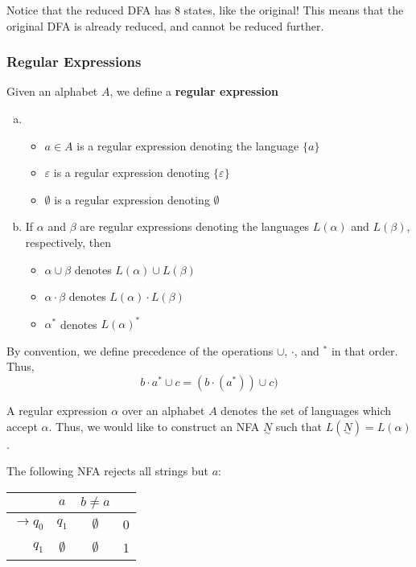 Notice that the reduced DFA has 8 states, like the original! This means that the original DFA is already reduced, and cannot be reduced further.

\subsubsection{Regular Expressions}
\begin{definition}
Given an alphabet $A$, we define a \textbf{regular expression}
\begin{enumerate}[(a)]
    \item \begin{itemize}
        \item $a\in A$ is a regular expression denoting the language $\{a\}$
        \item $\varepsilon$ is a regular expression denoting $\{\varepsilon\}$
        \item $\emptyset$ is a regular expression denoting $\emptyset$
    \end{itemize}
    
    \item If $\alpha$ and $\beta$ are regular expressions denoting the languages $L(\alpha)$ and $L(\beta)$, respectively, then 
    \begin{itemize}
        \item $\alpha\cup\beta$ denotes $L(\alpha)\cup L(\beta)$
        \item $\alpha\cdot\beta$ denotes $L(\alpha)\cdot L(\beta)$
        \item $\alpha^*$ denotes $L(\alpha)^*$
    \end{itemize}
\end{enumerate}
\end{definition}

By convention, we define precedence of the operations $\cup$, $\cdot$, and $^*$ in that order. Thus, \[b\cdot a^*\cup c=(b\cdot(a^*))\cup c)\]

A regular expression $\alpha$ over an alphabet $A$ denotes the set of languages which accept $\alpha$. Thus, we would like to construct an NFA $\underset{\sim}{N}$ such that $L(\underset{\sim}{N})=L(\alpha)$.

The following NFA rejects all strings but $a$:

\begin{center}\begin{tabular}{r| c c r}
      & $a$ & $b\neq a$ & \\\hline
      $\to q_0$ & $q_1$ & $\emptyset$ & 0\\
            $q_1$ & $\emptyset$ & $\emptyset$ & 1\\
 \end{tabular}\end{center}

